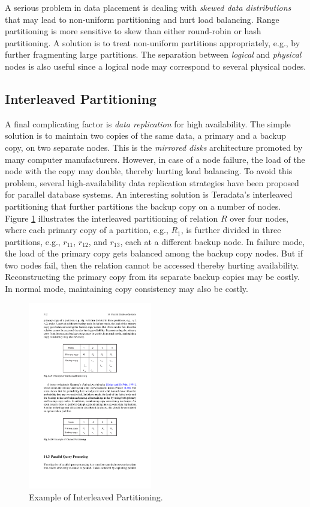 \documentclass{vldb}
\begin{document}
A serious problem in data placement is dealing with \textit{skewed data distributions} that may lead to non-uniform partitioning and hurt load balancing. Range partitioning is more sensitive to skew than either round-robin or hash partitioning. A solution is to treat non-uniform partitions appropriately, e.g., by further fragmenting large partitions. The separation between \textit{logical} and \textit{physical} nodes is also useful since a logical node may correspond to several physical nodes.

\subsection{Interleaved Partitioning}
A final complicating factor is \textit{data replication} for high availability. The simple solution is to maintain two copies of the same data, a primary and a backup copy, on two separate nodes. This is the \textit{mirrored disks} architecture promoted by many computer manufacturers. However, in case of a node failure, the load of the node with the copy may double, thereby hurting load balancing. To avoid this problem, several high-availability data replication strategies have been proposed for parallel database systems. An interesting solution is Teradata's interleaved partitioning that further partitions the backup copy on a number of nodes. Figure \ref{fig:interleaved} illustrates the interleaved partitioning of relation $R$ over four nodes, where each primary copy of a partition, e.g., $R_1$, is further divided in three partitions, e.g., $r_{11}$, $r_{12}$, and $r_{13}$, each at a different backup node. 
In failure mode, the load of the primary copy gets balanced among the backup copy nodes. But if two nodes fail, then the relation cannot be accessed thereby hurting availability. Reconstructing the primary copy from its separate backup copies may be costly. In normal mode, maintaining copy consistency may also be costly.
\begin{figure}[htb]
\centering
\includegraphics[width=0.48\textwidth]{interleaved}
\caption{Example of Interleaved Partitioning.}
\label{fig:interleaved}
\end{figure}
\end{document}
